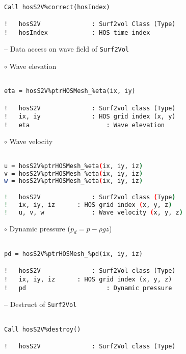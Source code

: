 \begin{lstlisting}[language={[95]Fortran}]

Call hosS2V%correct(hosIndex)

!	hosS2V				: Surf2vol Class (Type)
!	hosIndex			: HOS time index
\end{lstlisting}		

\vspace{0.5cm}	

\hspace{0.5 cm} -- Data access on wave field of \texttt{Surf2Vol}

\hspace{1.0 cm} $\circ$ Wave elevation 

\begin{lstlisting}[language={[95]Fortran}]

eta = hosS2V%ptrHOSMesh_%eta(ix, iy)

!	hosS2V				: Surf2vol class (Type)
!	ix, iy				: HOS grid index (x, y)
!	eta						: Wave elevation
\end{lstlisting}	

\hspace{1.0 cm} $\circ$ Wave velocity

\begin{lstlisting}[language=bash]

u = hosS2V%ptrHOSMesh_%eta(ix, iy, iz)
v = hosS2V%ptrHOSMesh_%eta(ix, iy, iz)
w = hosS2V%ptrHOSMesh_%eta(ix, iy, iz)

!	hosS2V				: Surf2vol class (Type)
!	ix, iy, iz		: HOS grid index (x, y, z)
!	u, v, w				: Wave velocity (x, y, z)
\end{lstlisting}	

\pagebreak

\hspace{1.0 cm} $\circ$ Dynamic pressure ($p_d = p - \rho g z$)

\begin{lstlisting}[language={[95]Fortran}]

pd = hosS2V%ptrHOSMesh_%pd(ix, iy, iz)

!	hosS2V				: Surf2Vol class (Type)
!	ix, iy, iz		: HOS grid index (x, y, z)
!	pd						: Dynamic pressure
\end{lstlisting}	

\vspace{0.5cm}	

\hspace{0.5 cm} -- Destruct of \texttt{Surf2Vol}

\begin{lstlisting}[language={[95]Fortran}]

Call hosS2V%destroy()

!	hosS2V				: Surf2Vol class (Type)
\end{lstlisting}


